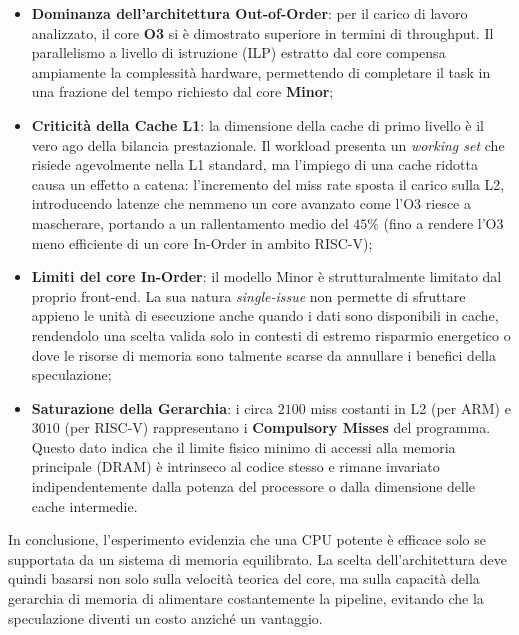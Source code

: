 \documentclass[../../main_document/main.tex]{subfiles}
\begin{document}
\begin{itemize}[leftmargin=1em]
    \item \textbf{Dominanza dell'architettura Out-of-Order}: per il carico di lavoro analizzato, il core \textbf{O3} si è dimostrato superiore in termini di throughput. Il parallelismo a livello di istruzione (ILP) estratto dal core compensa ampiamente la complessità hardware, permettendo di completare il task in una frazione del tempo richiesto dal core \textbf{Minor};
    \item \textbf{Criticità della Cache L1}: la dimensione della cache di primo livello è il vero ago della bilancia prestazionale. Il workload presenta un \textit{working set} che risiede agevolmente nella L1 standard, ma l'impiego di una cache ridotta causa un effetto a catena: l'incremento del miss rate sposta il carico sulla L2, introducendo latenze che nemmeno un core avanzato come l'O3 riesce a mascherare, portando a un rallentamento medio del $45\%$ (fino a rendere l'O3 meno efficiente di un core In-Order in ambito RISC-V);
    \item \textbf{Limiti del core In-Order}: il modello Minor è strutturalmente limitato dal proprio front-end. La sua natura \textit{single-issue} non permette di sfruttare appieno le unità di esecuzione anche quando i dati sono disponibili in cache, rendendolo una scelta valida solo in contesti di estremo risparmio energetico o dove le risorse di memoria sono talmente scarse da annullare i benefici della speculazione;
    \item \textbf{Saturazione della Gerarchia}: i circa $2100$ miss costanti in L2 (per ARM) e $3010$ (per RISC-V) rappresentano i \textbf{Compulsory Misses} del programma. Questo dato indica che il limite fisico minimo di accessi alla memoria principale (DRAM) è intrinseco al codice stesso e rimane invariato indipendentemente dalla potenza del processore o dalla dimensione delle cache intermedie.
\end{itemize}

\vspace{8pt}
\noindent
In conclusione, l'esperimento evidenzia che una CPU potente è efficace solo se supportata da un sistema di memoria equilibrato. La scelta dell'architettura deve quindi basarsi non solo sulla velocità teorica del core, ma sulla capacità della gerarchia di memoria di alimentare costantemente la pipeline, evitando che la speculazione diventi un costo anziché un vantaggio.

\newpage
\end{document}
